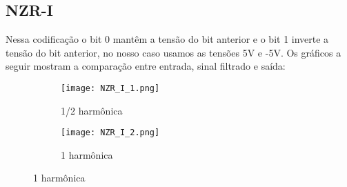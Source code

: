 \documentclass{article}
\begin{document}
        \subsection{NZR-I}
            Nessa codificação o bit 0 mantêm a tensão do bit anterior e o bit 1 inverte a tensão do bit anterior, no nosso caso usamos as tensões 5V e -5V. Os gráficos a seguir mostram a comparação entre entrada, sinal filtrado e saída:
            \begin{figure}[H]
                \begin{multicols}{2}
                    \begin{figure}[H]
                        \begin{center}
                            \texttt{[image: NZR\_I\_1.png]}
                            \caption{1/2 harmônica}
                            \label{fig:NZR_I_1}
                        \end{center}
                    \end{figure}
                    \begin{figure}[H]
                        \begin{center}
                            \texttt{[image: NZR\_I\_2.png]}
                            \caption{1 harmônica}
                            \label{fig:NZR_I_2}
                        \end{center}
                    \end{figure}
                    \end{multicols}
            \end{figure}
\end{document}
